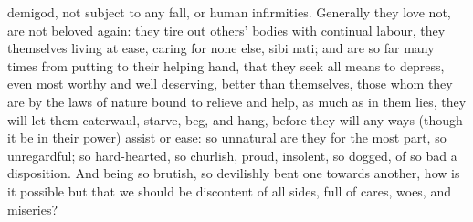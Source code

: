 {demigod, not subject to any fall, or human infirmities. Generally they
love not, are not beloved again: they tire out others' bodies with
continual labour, they themselves living at ease, caring for none else,
sibi nati; and are so far many times from putting to their helping
hand, that they seek all means to depress, even most worthy and well
deserving, better than themselves, those whom they are by the laws of
nature bound to relieve and help, as much as in them lies, they will
let them caterwaul, starve, beg, and hang, before they will any ways
(though it be in their power) assist or ease: so unnatural are
they for the most part, so unregardful; so hard-hearted, so churlish,
proud, insolent, so dogged, of so bad a disposition. And being so
brutish, so devilishly bent one towards another, how is it possible but
that we should be discontent of all sides, full of cares, woes, and
miseries?

}
